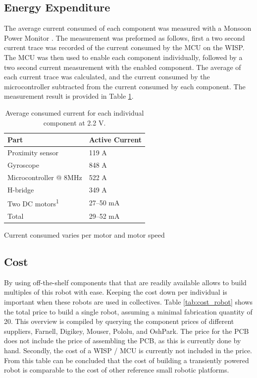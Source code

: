 \subsection{Energy Expenditure}

The average current consumed of each component was measured with a Monsoon Power Monitor \cite{monsoon_powermonitor_2017}.
The measurement was preformed as follows, first a two second current trace was recorded of the current consumed by the MCU on the WISP.
The MCU was then used to enable each component individually, followed by a two second current measurement with the enabled component.
The average of each current trace was calculated, and the current consumed by the microcontroller subtracted from the current consumed by each component.
The measurement result is provided in Table \ref{tab:avg_cur_comp}.


\begin{table}[t]
	\centering
	\begin{threeparttable}
		\caption{Average consumed current for each individual component at 2.2 V.}
		\label{tab:avg_cur_comp}
		\begin{tabular}{|l|l|} 
			\hline
			Part & Active Current \\
			\hline\hline
			Proximity sensor & 119 \textmu A \\
			Gyroscope & 848 \textmu A\\	
			Microcontroller @ 8MHz & 522 \textmu A\\
			H-bridge & 349 \textmu A \\
			Two DC motors\textsuperscript{1} & 27--50 mA  \\
			\hline \hline
			Total & 29--52 mA \\
			\hline
		\end{tabular}
		\begin{tablenotes}
		\small
		\item [1] Current consumed varies per motor and motor speed
		\end{tablenotes}
	\end{threeparttable}
\end{table}

\subsection{Cost}

By using off-the-shelf components that that are readily available allows to build multiples of this robot with ease.
Keeping the cost down per individual is important when these robots are used in collectives.
Table \ref{tab:cost_robot} shows the total price to build a single robot, assuming a minimal fabrication quantity of 20.
This overview is compiled by querying the component prices of different suppliers, Farnell, Digikey, Mouser, Pololu, and OshPark.
The price for the PCB does not include the price of assembling the PCB, as this is currently done by hand.
Secondly, the cost of a WISP / MCU is currently not included in the price.
From this table can be concluded that the cost of building a transiently powered robot is comparable to the cost of other reference small robotic platforms.


